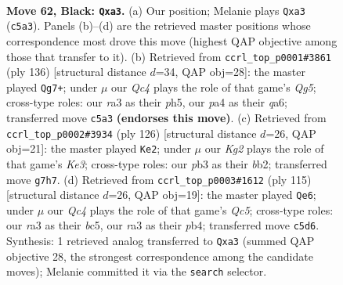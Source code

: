 \documentclass[11pt]{article}
\begin{document}
\clearpage

\begin{figure}[p]\centering
\begin{subfigure}{0.46\textwidth}\centering
\resizebox{\linewidth}{!}{%
\newchessgame
\chessboard[
  setfen={8/p5k1/1p6/2q5/P1p5/RP6/4K3/8 b - - 0 62},
  showmover=false,
  pgfstyle=straightmove, color=movearrow, markmove={c5-a3}
]}
\caption{}
\end{subfigure}\hfill
\begin{subfigure}{0.46\textwidth}\centering
\resizebox{\linewidth}{!}{%
\newchessgame
\chessboard[
  setfen={8/3k4/q7/6Qp/5p1P/6P1/2K5/8 w - - 4 69},
  showmover=false,
  pgfstyle=straightmove, color=movearrow, markmove={g5-g7}
]}
\caption{}
\end{subfigure}
\\[4pt]
\begin{subfigure}{0.46\textwidth}\centering
\resizebox{\linewidth}{!}{%
\newchessgame
\chessboard[
  setfen={5Q2/3k4/3r3p/5Pp1/6P1/4K3/1b6/8 w - - 33 64},
  showmover=false,
  pgfstyle=straightmove, color=movearrow, markmove={e3-e2}
]}
\caption{}
\end{subfigure}\hfill
\begin{subfigure}{0.46\textwidth}\centering
\resizebox{\linewidth}{!}{%
\newchessgame
\chessboard[
  setfen={8/8/p7/1pB5/1Pq5/8/1KPR4/5k2 b - - 42 58},
  showmover=false,
  pgfstyle=straightmove, color=movearrow, markmove={c4-e6}
]}
\caption{}
\end{subfigure}
\caption{\textbf{Move 62, Black: \texttt{Qxa3}.} (a) Our position; Melanie plays \texttt{Qxa3} (\texttt{c5a3}). Panels (b)--(d) are the retrieved master positions whose correspondence most drove this move (highest QAP objective among those that transfer to it). (b) Retrieved from \texttt{ccrl\_top\_p0001\#3861} (ply 136) [structural distance $d$=34, QAP obj=28]: the master played \texttt{Qg7+}; under $\mu$ our \emph{Qc4} plays the role of that game's \emph{Qg5}; cross-type roles: our \emph{r}a3 as their \emph{p}h5, our \emph{p}a4 as their \emph{q}a6; transferred move \texttt{c5a3} \textbf{(endorses this move)}. (c) Retrieved from \texttt{ccrl\_top\_p0002\#3934} (ply 126) [structural distance $d$=26, QAP obj=21]: the master played \texttt{Ke2}; under $\mu$ our \emph{Kg2} plays the role of that game's \emph{Ke3}; cross-type roles: our \emph{p}b3 as their \emph{b}b2; transferred move \texttt{g7h7}. (d) Retrieved from \texttt{ccrl\_top\_p0003\#1612} (ply 115) [structural distance $d$=26, QAP obj=19]: the master played \texttt{Qe6}; under $\mu$ our \emph{Qc4} plays the role of that game's \emph{Qc5}; cross-type roles: our \emph{r}a3 as their \emph{b}c5, our \emph{r}a3 as their \emph{p}b4; transferred move \texttt{c5d6}. Synthesis: 1 retrieved analog transferred to \texttt{Qxa3} (summed QAP objective 28, the strongest correspondence among the candidate moves); Melanie committed it via the \texttt{search} selector.}
\label{fig:thought-m123}
\end{figure}
\end{document}
